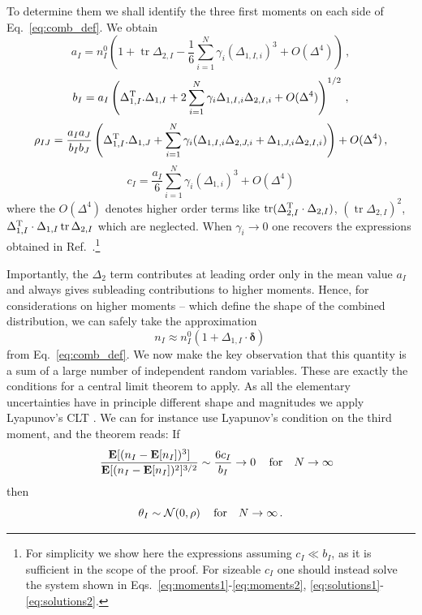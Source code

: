 \documentclass[11pt]{article}
\newcommand{\be}{\begin{equation}}
\newcommand{\ee}{\end{equation}}
\newcommand{\tr}{\operatorname{tr}}
\begin{document}
To determine them we shall identify the three first moments on each side of Eq.~\eqref{eq:comb_def}.
%
%
%
 We obtain
 \be
a_{I}=n^{0}_{I}\left(
1+\tr \Delta_{2,I}-\frac{1}{6}\sum_{i=1}^N \gamma_i(\Delta_{1,I,i})^3+O(\Delta^4) \right) \label{eq:n_comb}
\,,
\ee
\be
b_I=a_I\left(\Delta_{1,I}^{\rm T}.\Delta_{1,I}  +2\sum_{i=1}^N \gamma_i\Delta_{1,I,i}\Delta_{2,I,i}+O(\Delta^4)\right)^{1/2}\,,
\ee
\be
\rho_{IJ}= \frac{a_I a_J}{b_I b_J}\left(\Delta_{1,I}^{\rm T}.\Delta_{1,J}  +\sum_{i=1}^N \gamma_i(\Delta_{1,I,i}\Delta_{2,J,i}+\Delta_{1,J,i}\Delta_{2,I,i})\right)+O(\Delta^4)
\,,
\ee
\be
c_I=\frac{a_I}{6}\sum_{i=1}^N \gamma_i(\Delta_{1,i})^3+O(\Delta^4) \label{eq:gam_comb}
\ee
where the $O(\Delta^4)$ denotes higher order terms like $\tr(\Delta_{2,I}^{\rm T}\cdot\Delta_{2,I})$, $(\tr\Delta_{2,I})^2$, $\Delta_{1,I}^{\rm T}\cdot\Delta_{1,I}\tr\Delta_{2,I}$ which are neglected.
When $\gamma_i\rightarrow 0$  one recovers the expressions obtained in Ref.~\cite{Fichet:2016gvx}.\footnote{For simplicity we show here the expressions assuming $c_I\ll b_I$, as it is sufficient in the scope of the proof.
 For sizeable $c_I$ one should instead solve the system  shown in Eqs.~\eqref{eq:moments1}-\eqref{eq:moments2}, \eqref{eq:solutions1}-\eqref{eq:solutions2}.  }


Importantly,    the $\Delta_2$ term contributes at leading order only in the mean value
$a_I$
 and always gives subleading contributions to higher moments.
 Hence, for considerations on higher moments -- which define the  shape of the combined distribution, we can safely take the approximation
\be
n_{I}\approx n^{0}_{I}\left(1+ \Delta_{1,I}\cdot \boldsymbol{\delta}\right)\, \label{eq:n_approx}
\ee
from Eq.~\eqref{eq:comb_def}.
We now make  the key observation that this quantity is a sum of a large number of independent random variables. These are exactly the conditions for a central limit theorem to apply.
As all the elementary uncertainties have in principle different shape and magnitudes we apply Lyapunov's CLT \cite{Billingsley}. We can for instance use Lyapunov's condition on the third moment, and the theorem  reads: If
\be
\quad\frac{{\bf E}[(n_I-{\bf E}[n_I])^3]}{{\bf E}[(n_I-{\bf E}[n_I])^2]^{3/2}}\sim\frac{6 c_I}{b_I}\rightarrow 0 \quad \,\textrm{for} \quad N\rightarrow \infty
\ee
then
\be
\theta_I\sim {\cal N }(0,\rho) \quad \,\textrm{for} \quad N\rightarrow \infty \,.
\ee
\end{document}
